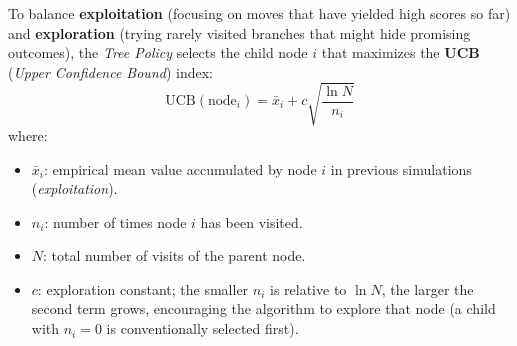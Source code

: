 \documentclass[10pt, a4paper]{report}
\begin{document}
To balance \textbf{exploitation} (focusing on moves that have yielded high scores so far) and \textbf{exploration} (trying rarely visited branches that might hide promising outcomes), the \emph{Tree Policy} selects the child node $i$ that maximizes the \textbf{UCB} (\emph{Upper Confidence Bound}) index:
\[
    \mathrm{UCB}(\mathrm{node}_i) = \bar{x}_i + c \sqrt{\frac{\ln N}{n_i}}
\]
where:
\begin{itemize}
    \item $\bar{x}_i$: empirical mean value accumulated by node $i$ in previous simulations (\emph{exploitation}).
    \item $n_i$: number of times node $i$ has been visited.
    \item $N$: total number of visits of the parent node.
    \item $c$: exploration constant; the smaller $n_i$ is relative to $\ln N$, the larger the second term grows, encouraging the algorithm to explore that node (a child with $n_i=0$ is conventionally selected first).
\end{itemize}
\end{document}
